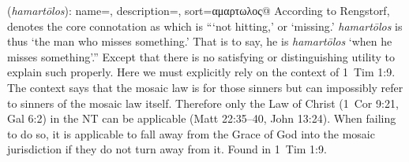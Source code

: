 \item[Sinner,]

(\textit{hamartōlos}):
{
    name=,
    description={},
    sort=αμαρτωλος@
}
According to Rengstorf,  denotes the core connotation as  which is ```not hitting,' or `missing.' \emph{hamartōlos} is thus `the man who misses something.' That is to say, he is \emph{hamartōlos} `when he misses something'.'' 
Except that there is no satisfying or distinguishing utility to explain such properly. Here we must explicitly rely on the context of 1~Tim 1:9. The context says that the mosaic law is for those sinners but can impossibly refer to sinners of the mosaic law itself. Therefore only the Law of Christ (1~Cor 9:21, Gal 6:2) in the NT can be applicable (Matt 22:35--40, John 13:24). When failing to do so, it is applicable to fall away from the Grace of God into the mosaic jurisdiction if they do not turn away from it.
Found in 1~Tim 1:9.
